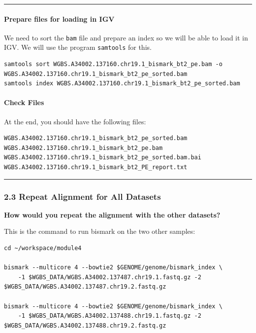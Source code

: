 \documentclass[
]{book}
\begin{document}
\begin{center}\rule{0.5\linewidth}{0.5pt}\end{center}

\paragraph{Prepare files for loading in IGV}\label{prepare-files-for-loading-in-igv}

We need to sort the \texttt{bam} file and prepare an index so we will be able to load it in IGV. We will use the program \texttt{samtools} for this.

\begin{verbatim}
samtools sort WGBS.A34002.137160.chr19.1_bismark_bt2_pe.bam -o WGBS.A34002.137160.chr19.1_bismark_bt2_pe_sorted.bam 
samtools index WGBS.A34002.137160.chr19.1_bismark_bt2_pe_sorted.bam
\end{verbatim}

\paragraph{Check Files}\label{check-files-1}

At the end, you should have the following files:

\begin{verbatim}
WGBS.A34002.137160.chr19.1_bismark_bt2_pe_sorted.bam
WGBS.A34002.137160.chr19.1_bismark_bt2_pe.bam         
WGBS.A34002.137160.chr19.1_bismark_bt2_pe_sorted.bam.bai
WGBS.A34002.137160.chr19.1_bismark_bt2_PE_report.txt
\end{verbatim}

\begin{center}\rule{0.5\linewidth}{0.5pt}\end{center}

\subsubsection{2.3 Repeat Alignment for All Datasets}\label{repeat-alignment-for-all-datasets}

\textbf{How would you repeat the alignment with the other datasets?}

This is the command to run bismark on the two other samples:

\begin{verbatim}
cd ~/workspace/module4

bismark --multicore 4 --bowtie2 $GENOME/genome/bismark_index \
    -1 $WGBS_DATA/WGBS.A34002.137487.chr19.1.fastq.gz -2 $WGBS_DATA/WGBS.A34002.137487.chr19.2.fastq.gz
    
bismark --multicore 4 --bowtie2 $GENOME/genome/bismark_index \
    -1 $WGBS_DATA/WGBS.A34002.137488.chr19.1.fastq.gz -2 $WGBS_DATA/WGBS.A34002.137488.chr19.2.fastq.gz
    
\end{verbatim}
\end{document}
